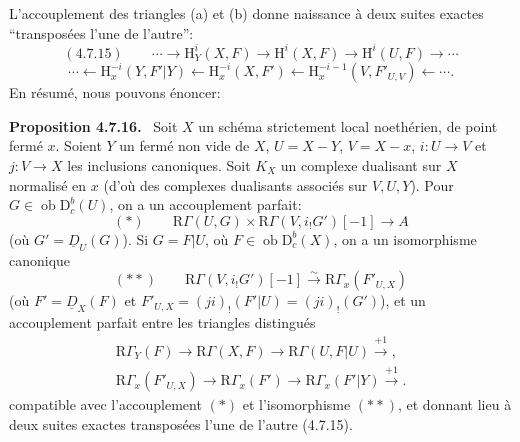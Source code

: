 \documentclass[11pt]{article}
\newenvironment{statement}[1]{\par\medskip\noindent\textbf{#1.}\ }{\par\medskip}
\renewcommand{\H}{\mathrm{H}}
\newcommand{\R}{\mathrm{R}}
\newcommand{\D}{\mathrm{D}}
\newcommand{\ob}{\operatorname{ob}}
\begin{document}
L'accouplement des triangles (a) et (b) donne naissance à deux suites exactes ``transposées l'une de l'autre'':
\[
(4.7.15)\qquad \cdots\longrightarrow \H_Y^i(X,F)\longrightarrow\H^i(X,F)\longrightarrow\H^i(U,F)\longrightarrow\cdots
\]
\[
\cdots\longleftarrow \H_x^{-i}(Y,F'|Y)\longleftarrow\H_x^{-i}(X,F')\longleftarrow\H_x^{-i-1}(V,F'_{U,V})\longleftarrow\cdots.
\]
En résumé, nous pouvons énoncer:

\begin{statement}{Proposition 4.7.16}
Soit $X$ un schéma strictement local noethérien, de point fermé $x$. Soient $Y$ un fermé non vide de $X$, $U=X-Y$, $V=X-x$, $i:U\to V$ et $j:V\to X$ les inclusions canoniques. Soit $K_X$ un complexe dualisant sur $X$ normalisé en $x$ (d'où des complexes dualisants associés sur $V,U,Y$). Pour $G\in\ob\D_c^b(U)$, on a un accouplement parfait:
\[
(*)\qquad \R\Gamma(U,G)\times\R\Gamma(V,i_!G')[-1]\longrightarrow A
\]
(où $G'=\underline{D}_U(G)$). Si $G=F|U$, où $F\in\ob\D_c^b(X)$, on a un isomorphisme canonique
\[
(**)\qquad \R\Gamma(V,i_!G')[-1]\xrightarrow{\sim}\R\Gamma_x(F'_{U,X})
\]
(où $F'=\underline{D}_X(F)$ et $F'_{U,X}=(ji)_!(F'|U)=(ji)_!(G')$), et un accouplement parfait entre les triangles distingués
\[
\begin{gathered}
\R\Gamma_Y(F)\longrightarrow \R\Gamma(X,F)\longrightarrow \R\Gamma(U,F|U)\xrightarrow{+1},\\
\R\Gamma_x(F'_{U,X})\longrightarrow \R\Gamma_x(F')\longrightarrow \R\Gamma_x(F'|Y)\xrightarrow{+1}.
\end{gathered}
\]
compatible avec l'accouplement $(*)$ et l'isomorphisme $(**)$, et donnant lieu à deux suites exactes transposées l'une de l'autre (4.7.15).
\end{statement}
\end{document}
